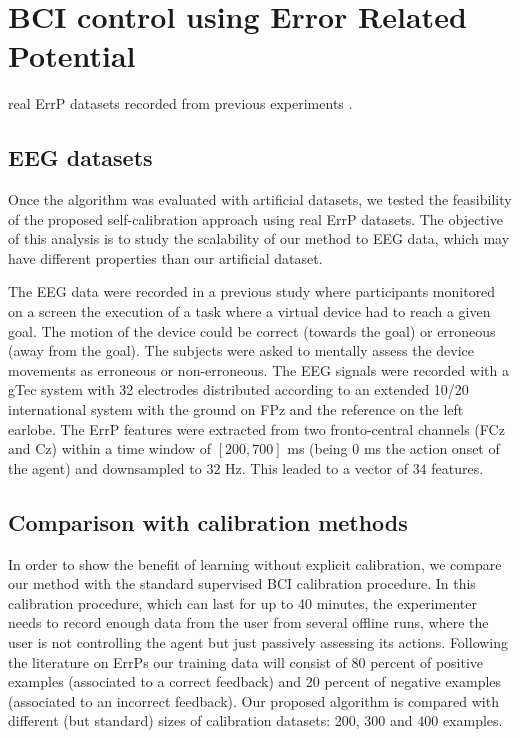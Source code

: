 \section{BCI control using Error Related Potential}

real ErrP datasets recorded from previous experiments \cite{iturrate2013task}.

\subsection{EEG datasets}
Once the algorithm was evaluated with artificial datasets, we tested the feasibility of the proposed self-calibration approach using real ErrP datasets. The objective of this analysis is to study the scalability of our method to EEG data, which may have different properties than our artificial dataset. 

The EEG data were recorded in a previous study \cite{iturrate2013task} where participants monitored on a screen the execution of a task where a virtual device had to reach a given goal. The motion of the device could be correct (towards the goal) or erroneous (away from the goal). The subjects were asked to mentally assess the device movements as erroneous or non-erroneous. The EEG signals were recorded with a gTec system with 32 electrodes distributed according to an extended 10/20 international system with the ground on FPz and the reference on the left earlobe. The ErrP features were extracted from two fronto-central channels (FCz and Cz) within a time window of $[200,700]$ ms (being 0 ms the action onset of the agent) and downsampled to $32$ Hz. This leaded to a vector of $34$ features.

\subsection{Comparison with calibration methods}
In order to show the benefit of learning without explicit calibration, we compare our method with the standard supervised BCI calibration procedure. In this calibration procedure, which can last for up to 40 minutes, the experimenter needs to record enough data from the user from several offline runs, where the user is not controlling the agent but just passively assessing its actions.
%
Following the literature on ErrPs \cite{chavarriaga2010learning,iturrate2013task} our training data will consist of 80 percent of positive examples (associated to a correct feedback) and 20 percent of negative examples (associated to an incorrect feedback). Our proposed algorithm is compared with different (but standard) sizes of calibration datasets: 200, 300 and 400 examples.




